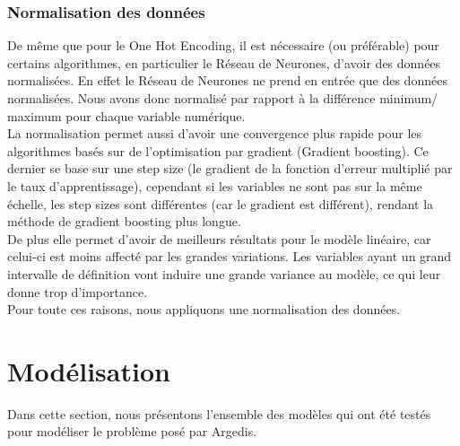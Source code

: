 \documentclass{article} %
\begin{document}
\subsubsection{Normalisation des données}
De même que pour le One Hot Encoding, il est nécessaire (ou préférable) pour certains algorithmes, en particulier le Réseau de Neurones, d'avoir des données normalisées. En effet le Réseau de Neurones ne prend en entrée que des données normalisées. Nous avons donc normalisé par rapport à la différence minimum/ maximum pour chaque variable numérique.\\
La normalisation permet aussi d'avoir une convergence plus rapide pour les algorithmes basés sur de l'optimisation par gradient (Gradient boosting). Ce dernier se base sur une step size (le gradient de la fonction d'erreur multiplié par le taux d'apprentissage), cependant si les variables ne sont pas sur la même échelle, les step sizes sont différentes (car le gradient est différent), rendant la méthode de gradient boosting plus longue.\\
De plus elle permet d'avoir de meilleurs résultats pour le modèle linéaire, car celui-ci est moins affecté par les grandes variations. Les variables ayant un grand intervalle de définition vont induire une grande variance au modèle, ce qui leur donne trop d'importance.\\
Pour toute ces raisons, nous appliquons une normalisation des données.
\newpage
\section{Modélisation}
Dans cette section, nous présentons l'ensemble des modèles qui ont été testés pour modéliser le problème posé par Argedis. 
\end{document}

